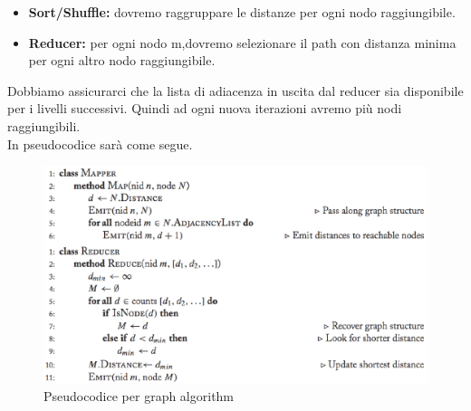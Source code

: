 \documentclass{article}
\begin{document}
\begin{appendices}
\begin{itemize}
\begin{itemize}
        \end{itemize}
    \item \textbf{Sort/Shuffle:} dovremo raggruppare le distanze per ogni nodo raggiungibile.
    \item \textbf{Reducer:} per ogni nodo m,dovremo selezionare il path con distanza minima per ogni altro nodo raggiungibile.
\end{itemize}
Dobbiamo assicurarci che la lista di adiacenza in uscita dal reducer sia disponibile per i livelli successivi. Quindi ad ogni nuova iterazioni avremo più nodi raggiungibili. \\
In pseudocodice sarà come segue.
\begin{figure}[H]
    \centering
    \includegraphics[scale=0.5]{img/GraphPseudocode.PNG}
    \caption{Pseudocodice per graph algorithm}
\end{figure}

\newpage

\end{appendices}
\end{document}
